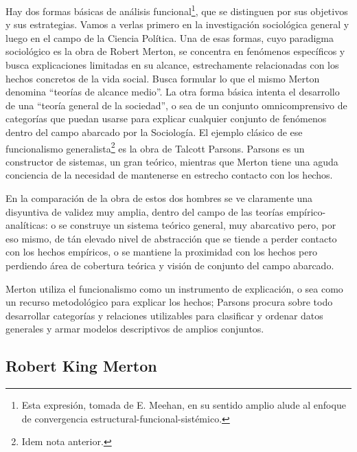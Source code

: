 \documentclass[
]{book}
\begin{document}
Hay dos formas básicas de análisis funcional\footnote{Esta expresión, tomada de E. Meehan, en su sentido amplio alude al enfoque de convergencia estructural-funcional-sistémico.}, que se distinguen por sus objetivos y sus estrategias. Vamos a verlas primero en la investigación sociológica general y luego en el campo de la Ciencia Política. Una de esas formas, cuyo paradigma sociológico es la obra de Robert Merton, se concentra en fenómenos específicos y busca explicaciones limitadas en su alcance, estrechamente relacionadas con los hechos concretos de la vida social. Busca formular lo que el mismo Merton denomina ``teorías de alcance medio''. La otra forma básica intenta el desarrollo de una ``teoría general de la sociedad'', o sea de un conjunto omnicomprensivo de categorías que puedan usarse para explicar cualquier conjunto de fenómenos dentro del campo abarcado por la Sociología. El ejemplo clásico de ese funcionalismo generalista\footnote{Idem nota anterior.} es la obra de Talcott Parsons. Parsons es un constructor de sistemas, un gran teórico, mientras que Merton tiene una aguda conciencia de la necesidad de mantenerse en estrecho contacto con los hechos.

En la comparación de la obra de estos dos hombres se ve claramente una disyuntiva de validez muy amplia, dentro del campo de las teorías empírico-analíticas: o se construye un sistema teórico general, muy abarcativo pero, por eso mismo, de tán elevado nivel de abstracción que se tiende a perder contacto con los hechos empíricos, o se mantiene la proximidad con los hechos pero perdiendo área de cobertura teórica y visión de conjunto del campo abarcado.

Merton utiliza el funcionalismo como un instrumento de explicación, o sea como un recurso metodológico para explicar los hechos; Parsons procura sobre todo desarrollar categorías y relaciones utilizables para clasificar y ordenar datos generales y armar modelos descriptivos de amplios conjuntos.

\hypertarget{robert-king-merton}{%
\subsection*{Robert King Merton}\label{robert-king-merton}}
\end{document}
